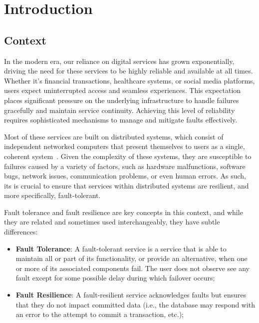 \chapter{Introduction}\label{ch:introduction}


\section{Context}\label{sec:context}

In the modern era, our reliance on digital services has grown exponentially, driving the need for these services to be highly reliable and available at all times. Whether it's financial transactions, healthcare systems, or social media platforms, users expect uninterrupted access and seamless experiences. This expectation places significant pressure on the underlying infrastructure to handle failures gracefully and maintain service continuity. Achieving this level of reliability requires sophisticated mechanisms to manage and mitigate faults effectively.

Most of these services are built on distributed systems,
which consist of independent networked computers that present themselves to users as a single,
coherent system~\cite{fcc-distributed-systems}.
Given the complexity of these systems, they are susceptible to failures caused by a variety of factors, such as hardware malfunctions, software bugs, network issues, communication problems, or even human errors.
As such, its is crucial to ensure that services within distributed systems are resilient, and more specifically, fault-tolerant.

Fault tolerance and fault resilience are key concepts in this context, and while they are related and sometimes used interchangeably, they have subtle differences:

\begin{itemize}
    \item {\textbf{Fault Tolerance}}:
    A fault-tolerant service is a service that is able to maintain all or part of its functionality,
    or provide an alternative, when one or more of its associated components fail.
    The user does not observe see any fault except for some possible delay during which failover occurs;
    \item {\textbf{Fault Resilience}}: A fault-resilient service acknowledges faults but ensures that they do not impact committed data (i.e., the database may respond with an error to the attempt to commit a transaction, etc.);
\end{itemize}

